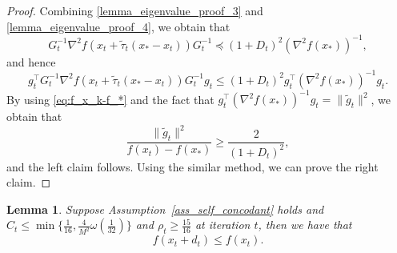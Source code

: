 \documentclass[11pt,letterpaper]{article}
\newcommand\0{{\Vector{0}}}
\newcommand\1{{\Vector{1}}}
\newtheorem{lemma}[theorem]{Lemma}
\numberwithin{assumption}{section}
\numberwithin{definition}{section}
\numberwithin{theorem}{section}
\numberwithin{remark}{section}
\begin{document}
\begin{proof}
    Combining \eqref{lemma_eigenvalue_proof_3} and \eqref{lemma_eigenvalue_proof_4}, we obtain that
    \begin{equation*}
        G_t^{-1}\nabla^2{f(x_t + \tilde{\tau}_t (x_{*} - x_{t}))}G_t^{-1} \preceq (1 + D_t)^2(\nabla^2{f(x_*)})^{-1},
    \end{equation*}
    and hence 
    \begin{equation*}
        g_t^\top G_t^{-1}\nabla^2{f(x_t + \tilde{\tau}_t (x_{*} - x_{t}))}G_t^{-1}g_t \leq (1 + D_t)^2 g_t^\top(\nabla^2{f(x_*)})^{-1} g_t.
    \end{equation*}
    By using \eqref{eq:f_x_k-f_*} and the fact that $g_t^\top(\nabla^2{f(x_*)})^{-1} g_t = \|\tilde{g}_t\|^2$, we obtain that
    \begin{equation*}
        \frac{\|\tilde{g}_t\|^2}{f(x_t)-f(x_*)} \geq \frac{2}{(1 + D_t)^2},
    \end{equation*}
    and the left claim follows. Using the similar method, we can prove the right claim. 
\end{proof}

\begin{lemma}\label{lemma_decrease}
    Suppose Assumption~\ref{ass_self_concodant} holds and $C_t \leq \min\{\frac{1}{16}, \frac{4}{M^2}\omega(\frac{1}{32})\}$ and $\rho_t \geq \frac{15}{16}$ at iteration $t$, then we have that
    \begin{equation}
        f(x_t + d_t) \leq f(x_t).
    \end{equation}
\end{lemma}
\end{document}
